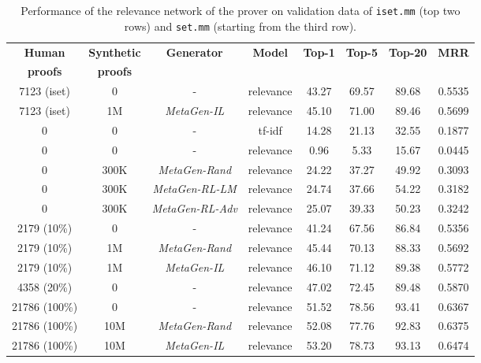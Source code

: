 \documentclass{article}
\begin{document}
\begin{table*}[t]
\caption{Performance of the relevance network of the prover on validation data of \texttt{iset.mm} (top two rows) and \texttt{set.mm} (starting from the third row).
}
\label{table:relevance}
\begin{center}
\begin{small}
\begin{sc}
\begin{tabular}{c c c c c c c c}
\toprule
\multicolumn{1}{c}{\bf Human  } 
&\multicolumn{1}{c}{\bf Synthetic  } 
&\multicolumn{1}{c}{\bf Generator}
&\multicolumn{1}{c}{\bf Model}
&\multicolumn{1}{c}{\bf Top-1}
&\multicolumn{1}{c}{\bf Top-5}
&\multicolumn{1}{c}{\bf Top-20}
&\multicolumn{1}{c}{\bf MRR}
\\ 
\multicolumn{1}{c}{\bf  proofs } 
&\multicolumn{1}{c}{\bf  proofs } 
&\multicolumn{1}{c}{\bf }
&\multicolumn{1}{c}{\bf }
&\multicolumn{1}{c}{\bf }
&\multicolumn{1}{c}{\bf }
&\multicolumn{1}{c}{\bf }
&\multicolumn{1}{c}{\bf }\\
\midrule
7123 (iset) & 0 & - & relevance & 43.27 & 69.57 & 89.68 & 0.5535 \\
7123 (iset) & 1M & \textit{MetaGen-IL} & relevance & 45.10 & 71.00 & 89.46 & 0.5699
\\ \midrule
0 & 0&- & tf-idf & 14.28 & 21.13 & 32.55 &0.1877 \\
0 & 0&- & relevance & 0.96 & 5.33 & 15.67 & 0.0445 \\
0 & 300K &\textit{MetaGen-Rand}& relevance & 24.22 & 37.27 & 49.92 & 0.3093 \\
0 & 300K &\textit{MetaGen-RL-LM}& relevance & 24.74 & 37.66 & 54.22 & 0.3182 \\ 
0 & 300K &\textit{MetaGen-RL-Adv}& relevance & 25.07 & 39.33 & 50.23 & 0.3242 \\\midrule
2179 (10\%) & 0 & -&  relevance& 41.24 & 67.56 & 86.84 & 0.5356 \\
2179 (10\%) & 1M&\textit{MetaGen-Rand}& relevance& 45.44 & 70.13 & 88.33 & 0.5692 \\
2179 (10\%) & 1M&\textit{MetaGen-IL}& relevance& 46.10 & 71.12 & 89.38 & 0.5772 \\ 
4358 (20\%) & 0 & - & relevance & 47.02 & 72.45 & 89.48 & 0.5870 \\
\midrule
21786 (100\%)&0 & -&  relevance& 51.52 & 78.56 & 93.41 & 0.6367 \\
21786 (100\%)& 10M & \textit{MetaGen-Rand}& relevance & 52.08 & 77.76 & 92.83 & 0.6375 \\
21786 (100\%)& 10M & \textit{MetaGen-IL}& relevance & 53.20 & 78.73 & 93.13 & 0.6474 \\
\bottomrule
\end{tabular}
\end{sc}
\end{small}
\end{center}
\vskip -0.1in
\end{table*}
\end{document}
